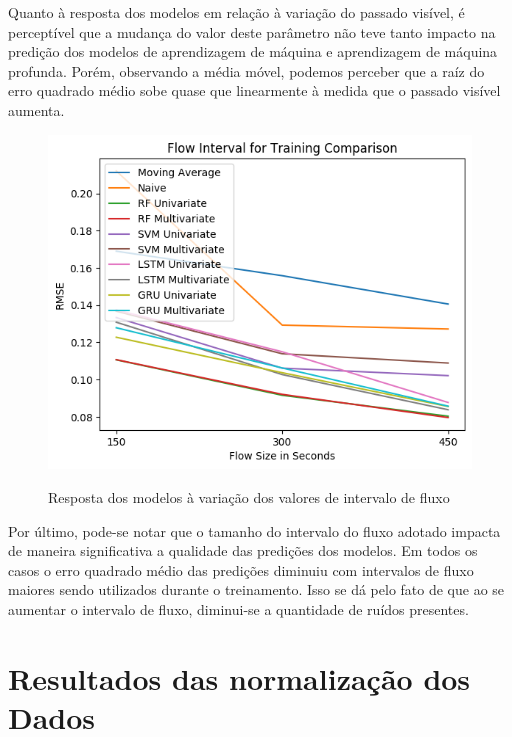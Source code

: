 Quanto à resposta dos modelos em relação à variação do passado visível, é perceptível que a mudança do valor deste parâmetro não teve tanto impacto na predição dos modelos de aprendizagem de máquina e aprendizagem de máquina profunda. Porém, observando a média móvel, podemos perceber que a raíz do erro quadrado médio sobe quase que linearmente à medida que o passado visível aumenta.

\begin{figure}[H]
    \centering
    \includegraphics[scale=0.8]{monography/img/flow_interval_for_training_comparison_rmse.png}
    \label{figure:rf}
    \caption{Resposta dos modelos à variação dos valores de intervalo de fluxo \textit{\acrshort{}}\footnotemark}
\end{figure}


Por último, pode-se notar que o tamanho do intervalo do fluxo adotado impacta de maneira significativa a qualidade das predições dos modelos. Em todos os casos o erro quadrado médio das predições diminuiu com intervalos de fluxo maiores sendo utilizados durante o treinamento. Isso se dá pelo fato de que ao se aumentar o intervalo de fluxo, diminui-se a quantidade de ruídos presentes.


\section{Resultados das normalização dos Dados}

